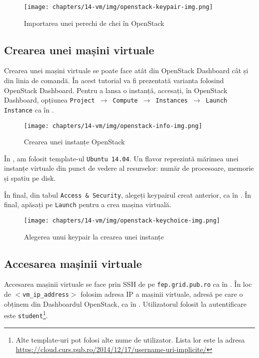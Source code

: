 \begin{figure}[!htbp]
  \centering
  \texttt{[image: chapters/14-vm/img/openstack-keypair-img.png]}
  \caption{Importarea unei perechi de chei în OpenStack}
  \label{fig:vm:openstack-keypair}
\end{figure}

\subsection{Crearea unei mașini virtuale}
\label{sec:vm:upb-openstack:createvm}

Crearea unei mașini virtuale se poate face atât din OpenStack Dashboard cât și din linia de comandă.
În acest tutorial va fi prezentată varianta folosind OpenStack Dashboard.
Pentru a lansa o instanță, accesați, în OpenStack Dashboard, opțiunea \texttt{Project $\rightarrow$ Compute $\rightarrow$ Instances $\rightarrow$ Launch Instance} ca în .

\begin{figure}[!htbp]
  \centering
  \texttt{[image: chapters/14-vm/img/openstack-info-img.png]}
  \caption{Crearea unei instanțe OpenStack}
  \label{fig:vm:openstack-info-img}
\end{figure}

În , am folosit template-ul \texttt{Ubuntu 14.04}.
Un flavor reprezintă mărimea unei instanțe virtuale din punct de vedere al resurselor: număr de procesoare, memorie și spatiu pe disk.

În final, din tabul \texttt{Access \& Security}, alegeți keypairul creat anterior, ca în .
În final, apăsați pe \texttt{Launch} pentru a crea mașina virtuală.

\begin{figure}[!htbp]
  \centering
  \texttt{[image: chapters/14-vm/img/openstack-keychoice-img.png]}
  \caption{Alegerea unui keypair la crearea unei instanțe}
  \label{fig:vm:openstack-keychoice}
\end{figure}

\subsection{Accesarea mașinii virtuale}
\label{sec:vm:upb-openstack:vm-access}

Accesarea mașinii virtuale se face prin SSH de pe \texttt{fep.grid.pub.ro} ca în .
 În loc de \texttt{$<$vm\_ip\_address$>$} folosim adresa IP a mașinii virtuale, adresă pe care o obținem din Dashboardul OpenStack, ca în .
 Utilizatorul folosit la autentificare este \texttt{student}\footnote{Alte template-uri pot folosi alte nume de utilizator.
Lista lor este la adresa \url{https://cloud.curs.pub.ro/2014/12/17/username-uri-implicite/}}.

